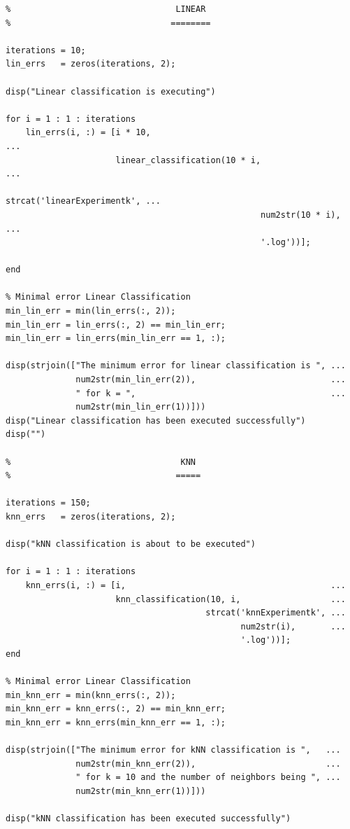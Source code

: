 \documentclass[11pt]{article}
\begin{document}
\begin{verbatim}
%                                 LINEAR
%                                ========

iterations = 10; 
lin_errs   = zeros(iterations, 2);

disp("Linear classification is executing")

for i = 1 : 1 : iterations
    lin_errs(i, :) = [i * 10,                                           ...
                      linear_classification(10 * i,                     ...
                                            strcat('linearExperimentk', ...
                                                   num2str(10 * i),     ...
                                                   '.log'))];
                      
end

% Minimal error Linear Classification
min_lin_err = min(lin_errs(:, 2));
min_lin_err = lin_errs(:, 2) == min_lin_err;
min_lin_err = lin_errs(min_lin_err == 1, :);

disp(strjoin(["The minimum error for linear classification is ", ...
              num2str(min_lin_err(2)),                           ...
              " for k = ",                                       ...
              num2str(min_lin_err(1))]))
disp("Linear classification has been executed successfully")
disp("")

%                                  KNN
%                                 =====

iterations = 150;
knn_errs   = zeros(iterations, 2); 

disp("kNN classification is about to be executed")

for i = 1 : 1 : iterations
    knn_errs(i, :) = [i,                                         ...
                      knn_classification(10, i,                  ...
                                        strcat('knnExperimentk', ...
                                               num2str(i),       ...
                                               '.log'))];
end

% Minimal error Linear Classification
min_knn_err = min(knn_errs(:, 2));
min_knn_err = knn_errs(:, 2) == min_knn_err;
min_knn_err = knn_errs(min_knn_err == 1, :);

disp(strjoin(["The minimum error for kNN classification is ",   ...
              num2str(min_knn_err(2)),                          ...
              " for k = 10 and the number of neighbors being ", ...
              num2str(min_knn_err(1))]))

disp("kNN classification has been executed successfully")
\end{verbatim}
\end{document}
